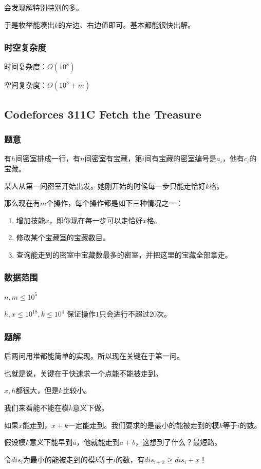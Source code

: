 \documentclass{ctexart}
\begin{document}
会发现解特别特别的多。

于是枚举能凑出$k$的左边、右边值即可。基本都能很快出解。
\subsubsection{时空复杂度}
时间复杂度：$O(10^8)$

空间复杂度：$O(10^8+m)$
\subsection{Codeforces 311C Fetch the Treasure}
\subsubsection{题意}
有$h$间密室排成一行，有$n$间密室有宝藏，第$i$间有宝藏的密室编号是$a_i$，他有$c_i$的宝藏。

某人从第一间密室开始出发。她刚开始的时候每一步只能走恰好$k$格。

那么现在有$m$个操作，每个操作都是如下三种情况之一：

\begin{enumerate}
\item 增加技能$x$，即你现在每一步可以走恰好$x$格。
\item 修改某个宝藏室的宝藏数目。
\item 查询能走到的密室中宝藏数最多的密室，并把这里的宝藏全部拿走。
\end{enumerate}
\subsubsection{数据范围}
$n,m \le 10^5$

$h,x \le 10^{18},k \le 10^4$
保证操作$1$只会进行不超过$20$次。
\subsubsection{题解}
后两问用堆都能简单的实现。所以现在关键在于第一问。

也就是说，关键在于快速求一个点能不能被走到。

$x,h$都很大，但是$k$比较小。

我们来看能不能在模$k$意义下做。

如果$x$能走到，$x+k$一定能走到。我们要求的是最小的能被走到的模$k$等于$i$的数。

假设模$k$意义下能早到$a$，他就能走到$a+b$，这想到了什么？最短路。

令$dis_i$为最小的能被走到的模$k$等于$i$的数，有$dis_{i+x} \ge dis_i+x$！
\end{document}
